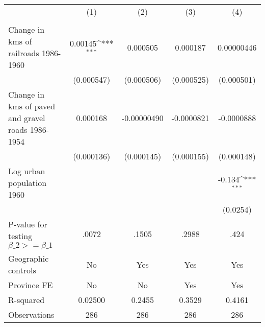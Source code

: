 {
\def\sym#1{\ifmmode^{#1}\else\(^{#1}\)\fi}
\begin{tabular}{l*{4}{c}}
\hline\hline
                &\multicolumn{1}{c}{(1)}&\multicolumn{1}{c}{(2)}&\multicolumn{1}{c}{(3)}&\multicolumn{1}{c}{(4)}\\
                &\multicolumn{1}{c}{}&\multicolumn{1}{c}{}&\multicolumn{1}{c}{}&\multicolumn{1}{c}{}\\
\hline
Change in kms of railroads 1986-1960&  0.00145\sym{***}& 0.000505         & 0.000187         &0.00000446         \\
                &(0.000547)         &(0.000506)         &(0.000525)         &(0.000501)         \\
[1em]
Change in kms of paved and gravel roads 1986-1954& 0.000168         &-0.00000490         &-0.0000821         &-0.0000888         \\
                &(0.000136)         &(0.000145)         &(0.000155)         &(0.000148)         \\
[1em]
Log urban population 1960&                  &                  &                  &   -0.134\sym{***}\\
                &                  &                  &                  & (0.0254)         \\
\hline
P-value for testing $\beta\_{2} >= \beta\_{1}$&    .0072         &    .1505         &    .2988         &     .424         \\
Geographic controls&       No         &      Yes         &      Yes         &      Yes         \\
Province FE     &       No         &       No         &      Yes         &      Yes         \\
R-squared       &  0.02500         &   0.2455         &   0.3529         &   0.4161         \\
Observations    &      286         &      286         &      286         &      286         \\
\hline\hline
\end{tabular}
}
